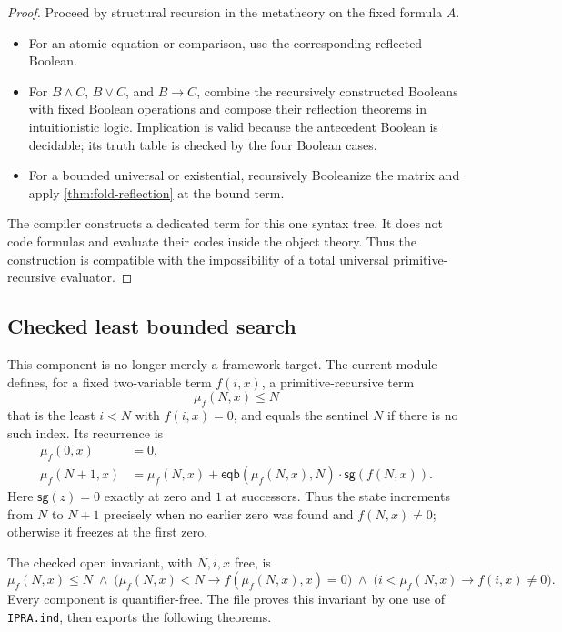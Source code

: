\begin{proof}
Proceed by structural recursion in the metatheory on the fixed formula \(A\).
\begin{itemize}
  \item For an atomic equation or comparison, use the corresponding reflected Boolean.
  \item For \(B\wedge C\), \(B\vee C\), and \(B\to C\), combine the recursively constructed Booleans with fixed Boolean operations and compose their reflection theorems in intuitionistic logic.  Implication is valid because the antecedent Boolean is decidable; its truth table is checked by the four Boolean cases.
  \item For a bounded universal or existential, recursively Booleanize the matrix and apply \cref{thm:fold-reflection} at the bound term.
\end{itemize}
The compiler constructs a dedicated term for this one syntax tree.  It does not code formulas and evaluate their codes inside the object theory.  Thus the construction is compatible with the impossibility of a total universal primitive-recursive evaluator.
\end{proof}

\subsection{Checked least bounded search}

This component is no longer merely a framework target.  The current module
 defines, for a fixed two-variable term \(f(i,x)\), a primitive-recursive term
\[
  \mu_f(N,x)\le N
\]
that is the least \(i<N\) with \(f(i,x)=0\), and equals the sentinel \(N\) if there is no such index.  Its recurrence is
\begin{align*}
  \mu_f(0,x)&=0,\\
  \mu_f(N+1,x)&=\mu_f(N,x)+
     \mathsf{eqb}(\mu_f(N,x),N)\cdot \mathsf{sg}(f(N,x)).
\end{align*}
Here \(\mathsf{sg}(z)=0\) exactly at zero and \(1\) at successors.  Thus the state increments from \(N\) to \(N+1\) precisely when no earlier zero was found and \(f(N,x)\ne0\); otherwise it freezes at the first zero.

The checked open invariant, with \(N,i,x\) free, is
\[
  \mu_f(N,x)\le N
  \;\wedge\;
  \bigl(\mu_f(N,x)<N\to f(\mu_f(N,x),x)=0\bigr)
  \;\wedge\;
  \bigl(i<\mu_f(N,x)\to f(i,x)\ne0\bigr).
\]
Every component is quantifier-free.  The file proves this invariant by one use of \texttt{IPRA.ind}, then exports the following theorems.

